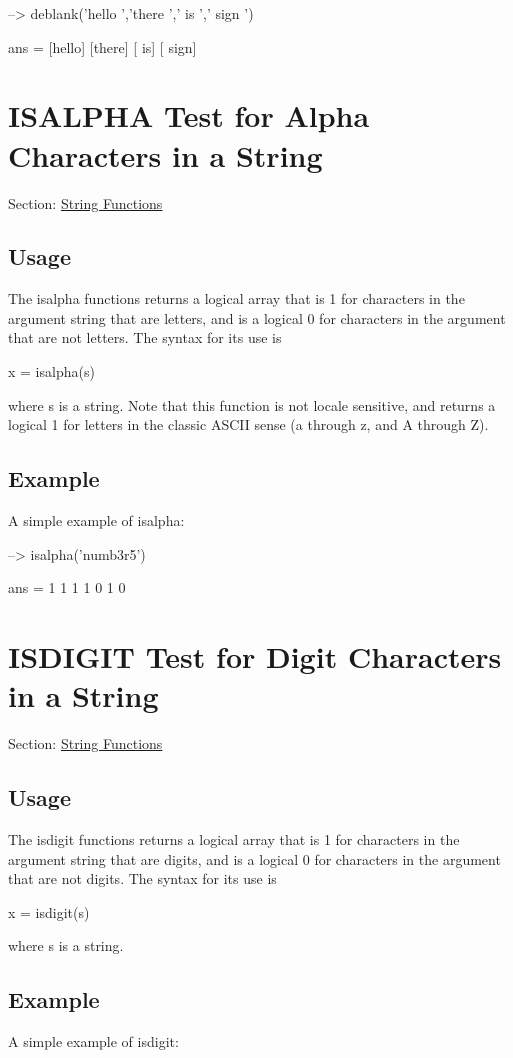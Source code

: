 \begin{DoxyVerbInclude}
--> deblank({'hello  ','there ','  is  ','  sign  '})

ans = 
 [hello] [there] [  is] [  sign] 
\end{DoxyVerbInclude}
 \hypertarget{string_isalpha}{}\section{I\-S\-A\-L\-P\-H\-A Test for Alpha Characters in a String}\label{string_isalpha}
Section\-: \hyperlink{sec_string}{String Functions} \hypertarget{vtkwidgets_vtkxyplotwidget_Usage}{}\subsection{Usage}\label{vtkwidgets_vtkxyplotwidget_Usage}
The {\ttfamily isalpha} functions returns a logical array that is 1 for characters in the argument string that are letters, and is a logical 0 for characters in the argument that are not letters. The syntax for its use is \begin{DoxyVerb}   x = isalpha(s)
\end{DoxyVerb}
 where {\ttfamily s} is a {\ttfamily string}. Note that this function is not locale sensitive, and returns a logical 1 for letters in the classic A\-S\-C\-I\-I sense (a through z, and A through Z). \hypertarget{variables_struct_Example}{}\subsection{Example}\label{variables_struct_Example}
A simple example of {\ttfamily isalpha}\-:


\begin{DoxyVerbInclude}
--> isalpha('numb3r5')

ans = 
 1 1 1 1 0 1 0 
\end{DoxyVerbInclude}
 \hypertarget{string_isdigit}{}\section{I\-S\-D\-I\-G\-I\-T Test for Digit Characters in a String}\label{string_isdigit}
Section\-: \hyperlink{sec_string}{String Functions} \hypertarget{vtkwidgets_vtkxyplotwidget_Usage}{}\subsection{Usage}\label{vtkwidgets_vtkxyplotwidget_Usage}
The {\ttfamily isdigit} functions returns a logical array that is 1 for characters in the argument string that are digits, and is a logical 0 for characters in the argument that are not digits. The syntax for its use is \begin{DoxyVerb}   x = isdigit(s)
\end{DoxyVerb}
 where {\ttfamily s} is a {\ttfamily string}. \hypertarget{variables_struct_Example}{}\subsection{Example}\label{variables_struct_Example}
A simple example of {\ttfamily isdigit}\-:


